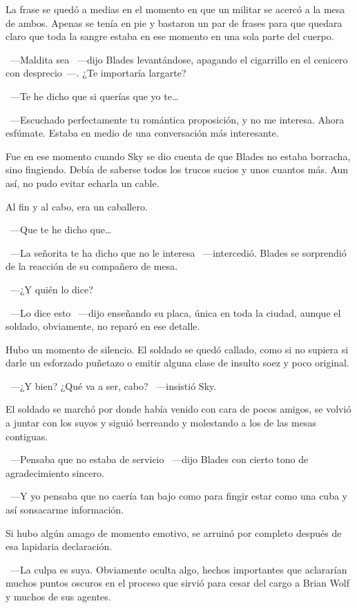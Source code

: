 La frase se quedó a medias en el momento en que un militar se acercó a la mesa de ambos. Apenas se tenía en pie y bastaron un par de frases para que quedara claro que toda la sangre estaba en ese momento en una sola parte del cuerpo.

~---Maldita sea ~---dijo Blades levantándose, apagando el cigarrillo en el cenicero con desprecio~---. ¿Te importaría largarte?

~---Te he dicho que si querías que yo te\dots

~---Escuchado perfectamente tu romántica proposición, y no me interesa. Ahora esfúmate. Estaba en medio de una conversación más interesante.

Fue en ese momento cuando Sky se dio cuenta de que Blades no estaba borracha, sino fingiendo. Debía de saberse todos los trucos sucios y unos cuantos más. Aun así, no pudo evitar echarla un cable.

Al fin y al cabo, era un caballero.

~---Que te he dicho que\dots

~---La señorita te ha dicho que no le interesa ~---intercedió. Blades se sorprendió de la reacción de su compañero de mesa.

~---¿Y quién lo dice?

~---Lo dice esto ~---dijo enseñando su placa, única en toda la ciudad, aunque el soldado, obviamente, no reparó en ese detalle.

Hubo un momento de silencio. El soldado se quedó callado, como si no supiera si darle un esforzado puñetazo o emitir alguna clase de insulto soez y poco original.

~---¿Y bien? ¿Qué va a ser, cabo? ~---insistió Sky.

El soldado se marchó por donde había venido con cara de pocos amigos, se volvió a juntar con los suyos y siguió berreando y molestando a los de las mesas contiguas.

~---Pensaba que no estaba de servicio ~---dijo Blades con cierto tono de agradecimiento sincero.

~---Y yo pensaba que no caería tan bajo como para fingir estar como una cuba y así sonsacarme información.

Si hubo algún amago de momento emotivo, se arruinó por completo después de esa lapidaria declaración.

~---La culpa es suya. Obviamente oculta algo, hechos importantes que aclararían muchos puntos oscuros en el proceso que sirvió para cesar del cargo a Brian Wolf y muchos de sus agentes.

